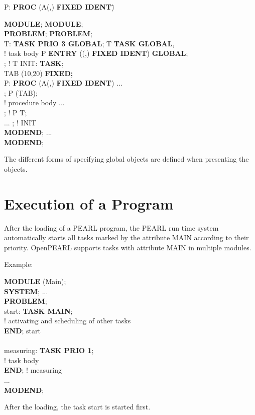 \begin{tabbing}
\x P: {\bf PROC} (A(,) {\bf FIXED IDENT})\=  \kill

{\bf MODULE};                     \> {\bf MODULE};\\
{\bf PROBLEM};                    \> {\bf PROBLEM};\\
\x T: {\bf TASK PRIO 3 GLOBAL};   \>  T {\bf TASK GLOBAL},\\
\x \x \x ! task body              \> \x \x P {\bf ENTRY} ((,) {\bf FIXED IDENT}) {\bf GLOBAL};\\
; ! T              \> \x INIT: {\bf TASK};\\
                                  \> \x {} TAB (10,20) {\bf FIXED;}\\
\x P: {\bf PROC} (A(,) {\bf FIXED IDENT}) \> \x \x ...\\
\x \x \x {};         \> \x {} P (TAB);\\
\x \x \x ! procedure body         \> \x \x ... \\
; ! P              \> \x {} T;\\
\x ...                            \> ; ! INIT\\
{\bf MODEND};                     \> \x ...\\
                                  \> {\bf MODEND};
\end{tabbing}

The different forms of specifying global objects are defined when
presenting the objects.

\section{Execution of a Program}   %
\label{sec_program_execution}

After the loading of a PEARL program, the PEARL run time system
automatically starts all tasks marked by the attribute MAIN according
to their priority.  
OpenPEARL supports tasks with attribute MAIN in multiple modules.

Example:

\begin{tabbing}
{\bf MODULE} (Main); \= \\
{\bf SYSTEM}; ...    \> \\
{\bf PROBLEM};       \> \\
start:               \> {\bf TASK MAIN};\\
                     \> ! activating and scheduling of other tasks\\
                     \> {\bf END}; start\\
                     \> \\
measuring:           \> {\bf TASK PRIO 1};\\
                     \> ! task body \\
                     \> {\bf END}; ! measuring\\
...                  \> \\
{\bf MODEND};        \>
\end{tabbing}

After the loading, the task start is started first.

